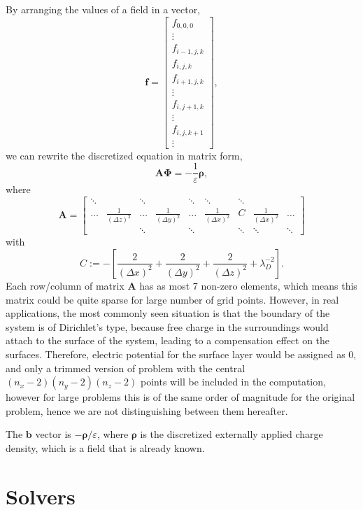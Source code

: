 \documentclass{article}
\begin{document}
\begin{spacing}{1.1}
By arranging the values of a field in a vector,
\[\mathbf{f}=\left[\begin{matrix}f_{0,0,0} \\ \vdots \\ f_{i-1,j,k} \\ f_{i,j,k} \\ f_{i+1,j,k} \\ \vdots \\ f_{i,j+1,k} \\ \vdots \\ f_{i,j,k+1} \\ \vdots\end{matrix}\right],\]
we can rewrite the discretized equation in matrix form,
\[\mathbf{A\Phi}=-\frac{1}{\varepsilon}\mathbf{\rho},\]
where
\[\mathbf{A}=
\left[\begin{matrix}
\ddots & & \ddots & & \ddots & \ddots & \ddots\\
\dots & \frac{1}{(\Delta z)^2} & \dots & \frac{1}{(\Delta y)^2} & \dots & \frac{1}{(\Delta x)^2} & C & \frac{1}{(\Delta x)^2} & \dots\\
& & \ddots & & \ddots & & \ddots & \ddots & \ddots
\end{matrix}\right]\]
with
\[C:=-\left[\frac{2}{(\Delta x)^2}+\frac{2}{(\Delta y)^2}+\frac{2}{(\Delta z)^2}+\lambda_D^{-2}\right].\]
Each row/column of matrix $\mathbf{A}$ has as most 7 non-zero elements, which means this matrix could be quite sparse for large number of grid points. However, in real applications, the most commonly seen situation is that the boundary of the system is of Dirichlet's type, because free charge in the surroundings would attach to the surface of the system, leading to a compensation effect on the surfaces. Therefore, electric potential for the surface layer would be assigned as 0, and only a trimmed version of problem with the central $(n_x-2)(n_y-2)(n_z-2)$ points will be included in the computation, however for large problems this is of the same order of magnitude for the original problem, hence we are not distinguishing between them hereafter.



The $\mathbf{b}$ vector is  $-\mathbf{\rho}/\varepsilon$, where $\mathbf{\rho}$ is the discretized externally applied charge density, which is a field that is already known.

\section{Solvers}


\end{spacing}
\end{document}
